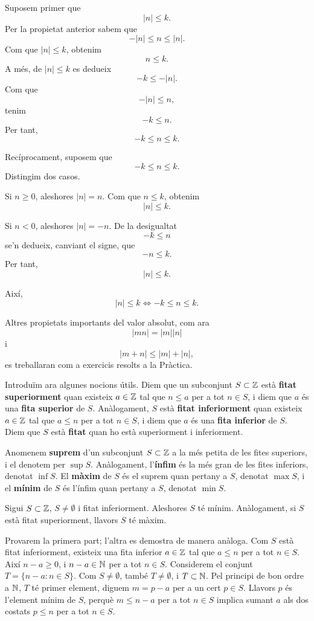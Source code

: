 \begin{prova}
Suposem primer que
\[
|n|\leq k.
\]
Per la propietat anterior sabem que
\[
-|n|\leq n\leq |n|.
\]
Com que $|n|\leq k$, obtenim
\[
n\leq k.
\]
A més, de $|n|\leq k$ es dedueix
\[
-k\leq -|n|.
\]
Com que
\[
-|n|\leq n,
\]
tenim
\[
-k\leq n.
\]
Per tant,
\[
-k\leq n\leq k.
\]

Recíprocament, suposem que
\[
-k\leq n\leq k.
\]
Distingim dos casos.

Si $n\geq 0$, aleshores $|n|=n$. Com que $n\leq k$, obtenim
\[
|n|\leq k.
\]

Si $n<0$, aleshores $|n|=-n$. De la desigualtat
\[
-k\leq n
\]
se'n dedueix, canviant el signe, que
\[
-n\leq k.
\]
Per tant,
\[
|n|\leq k.
\]

Així,
\[
|n|\leq k \iff -k\leq n\leq k.
\]
\end{prova}

\begin{observacio}
Altres propietats importants del valor absolut, com ara
\[
|mn|=|m||n|
\]
i
\[
|m+n|\leq |m|+|n|,
\]
es treballaran com a exercicis resolts a la Pràctica.
\end{observacio}

Introduïm ara algunes nocions útils. Diem que un subconjunt $S\subset \mathbb{Z}$ està \textbf{fitat superiorment} quan existeix $a\in \mathbb{Z}$ tal que $n\leq a$ per a tot $n\in S$, i diem que $a$ és una \textbf{fita superior} de $S$. Anàlogament, $S$ està \textbf{fitat inferiorment} quan existeix $a\in \mathbb{Z}$ tal que $a\leq n$ per a tot $n\in S$, i diem que $a$ és una \textbf{fita inferior} de $S$. Diem que $S$ està \textbf{fitat} quan ho està superiorment i inferiorment.

Anomenem \textbf{suprem} d'un subconjunt $S\subset \mathbb{Z}$ a la més petita de les fites superiors, i el denotem per $\sup S$. Anàlogament, l'\textbf{ínfim} és la més gran de les fites inferiors, denotat $\inf S$. El \textbf{màxim} de $S$ és el suprem quan pertany a $S$, denotat $\max S$, i el \textbf{mínim} de $S$ és l'ínfim quan pertany a $S$, denotat $\min S$.

\begin{teorema}
Sigui $S\subset \mathbb{Z}$, $S\neq \emptyset$ i fitat inferiorment. Aleshores $S$ té mínim. Anàlogament, si $S$ està fitat superiorment, llavors $S$ té màxim.
\end{teorema}

\begin{prova}
Provarem la primera part; l'altra es demostra de manera anàloga. Com $S$ està fitat inferiorment, existeix una fita inferior $a\in \mathbb{Z}$ tal que $a\leq n$ per a tot $n\in S$. Així $n-a\geq 0$, i $n-a\in \mathbb{N}$ per a tot $n\in S$. Considerem el conjunt $T=\{n-a:n\in S\}$. Com $S\neq \emptyset$, també $T\neq \emptyset$, i $T\subset \mathbb{N}$. Pel principi de bon ordre a $\mathbb{N}$, $T$ té primer element, diguem $m=p-a$ per a un cert $p\in S$. Llavors $p$ és l'element mínim de $S$, perquè $m\leq n-a$ per a tot $n\in S$ implica sumant $a$ als dos costats $p\leq n$ per a tot $n\in S$.
\end{prova}

